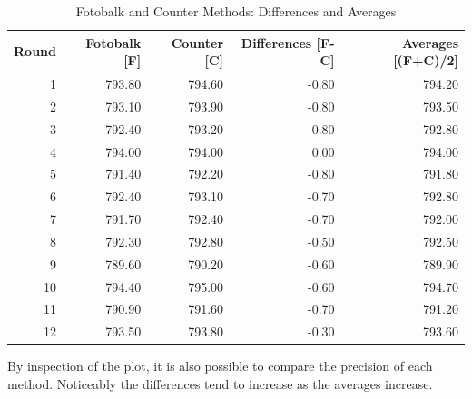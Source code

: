 \documentclass[12pt, a4paper]{report}
\theoremstyle{plain}
\theoremstyle{definition}
\theoremstyle{remark}
\begin{document}
	\begin{table}[tbh]
		\begin{center}
			
			\begin{tabular}{rrrrr}
				\hline
				Round & Fotobalk [F] & Counter [C] & Differences [F-C] & Averages [(F+C)/2] \\
				\hline
				1 & 793.80 & 794.60 & -0.80 & 794.20 \\
				2 & 793.10 & 793.90 & -0.80 & 793.50 \\
				3 & 792.40 & 793.20 & -0.80 & 792.80 \\
				4 & 794.00 & 794.00 & 0.00 & 794.00 \\
				5 & 791.40 & 792.20 & -0.80 & 791.80 \\
				6 & 792.40 & 793.10 & -0.70 & 792.80 \\
				7 & 791.70 & 792.40 & -0.70 & 792.00 \\
				8 & 792.30 & 792.80 & -0.50 & 792.50 \\
				9 & 789.60 & 790.20 & -0.60 & 789.90 \\
				10 & 794.40 & 795.00 & -0.60 & 794.70 \\
				11 & 790.90 & 791.60 & -0.70 & 791.20 \\
				12 & 793.50 & 793.80 & -0.30 & 793.60 \\
				\hline
			\end{tabular}
			\caption{Fotobalk and Counter Methods: Differences and Averages}
		\end{center}
	\end{table}
	
	
	
	By inspection of the plot, it is also possible to compare the
	precision of each method. Noticeably the differences tend to
	increase as the averages increase.
	
		
\end{document}
